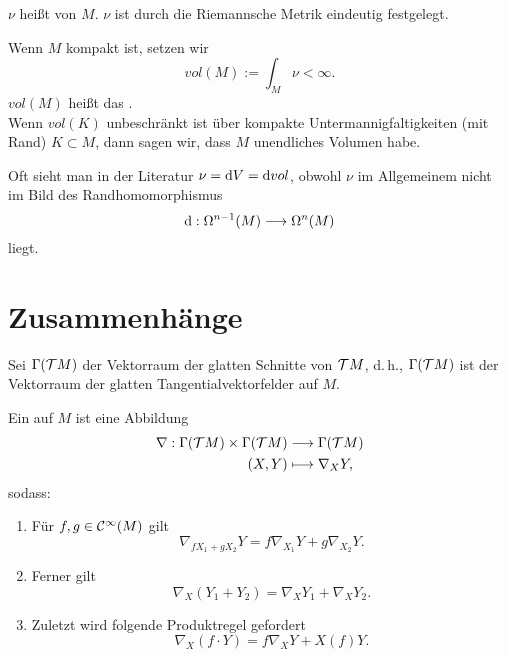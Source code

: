 \Def{}
$\nu$ heißt  von $M$. $\nu$ ist durch die Riemannsche Metrik eindeutig festgelegt.

\Def{}
Wenn $M$ kompakt ist, setzen wir
\[ vol(M) := \int_M \nu < \infty. \]
$vol(M)$ heißt das .\\
Wenn $vol(K)$ unbeschränkt ist über kompakte Untermannigfaltigkeiten (mit Rand) $K \subset M$, dann sagen wir, dass $M$ unendliches Volumen habe.

\Bem{}
Oft sieht man in der Literatur $\nu = \text{d} V = \text{d} vol$, obwohl $\nu$ im Allgemeinem nicht im Bild des Randhomomorphismus
\[ \text{d} : \Omega^{n-1}(M) \overset{}{\longrightarrow} \Omega^n(M) \]
liegt.

\newpage
\section{Zusammenhänge}
Sei $\Gamma(\mathcal{T} M)$ der Vektorraum der glatten Schnitte von $\mathcal{T} M$, d.\,h., $\Gamma(\mathcal{T} M)$ ist der Vektorraum der glatten Tangentialvektorfelder auf $M$.

\Def{}
Ein  auf $M$ ist eine Abbildung
\begin{align*}
\nabla : \Gamma(\mathcal{T} M) \times \Gamma(\mathcal{T} M ) &\overset{}{\longrightarrow} \Gamma(\mathcal{T} M)\\
(X,Y) & \longmapsto \nabla_XY ,
\end{align*}
sodass:
\begin{enumerate}[(1)]
	\item Für $f,g \in \mathcal{C}^{\infty}(M)$ gilt
	\[\nabla_{fX_1 + gX_2}Y = f\nabla_{X_1}Y + g \nabla_{X_2}Y.\]
	\item Ferner gilt
	\[ \nabla_X(Y_1 + Y_2) = \nabla_X Y_1 + \nabla_X Y_2. \]
	\item Zuletzt wird folgende Produktregel gefordert
	\[ \nabla_X(f\cdot Y) = f\nabla_XY + X(f)Y. \]
\end{enumerate}

